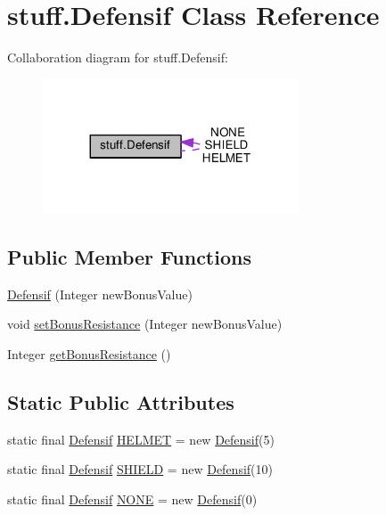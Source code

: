 \hypertarget{classstuff_1_1_defensif}{}\section{stuff.\+Defensif Class Reference}
\label{classstuff_1_1_defensif}


Collaboration diagram for stuff.\+Defensif\+:\nopagebreak
\begin{figure}[H]
\begin{center}
\leavevmode
\includegraphics[width=215pt]{classstuff_1_1_defensif__coll__graph}
\end{center}
\end{figure}
\subsection*{Public Member Functions}
\begin{DoxyCompactItemize}
\item 
\hyperlink{classstuff_1_1_defensif_a80561aaf769f44326898b42fb6858bef}{Defensif} (Integer new\+Bonus\+Value)
\item 
void \hyperlink{classstuff_1_1_defensif_a321e58e3129d7e11e4f67b5217713cc8}{set\+Bonus\+Resistance} (Integer new\+Bonus\+Value)
\item 
Integer \hyperlink{classstuff_1_1_defensif_ac92baf4d044b06d44086c54e6099cad2}{get\+Bonus\+Resistance} ()
\end{DoxyCompactItemize}
\subsection*{Static Public Attributes}
\begin{DoxyCompactItemize}
\item 
static final \hyperlink{classstuff_1_1_defensif}{Defensif} \hyperlink{classstuff_1_1_defensif_adf59790d842ebf28a331743caebc2790}{H\+E\+L\+M\+ET} = new \hyperlink{classstuff_1_1_defensif}{Defensif}(5)
\item 
static final \hyperlink{classstuff_1_1_defensif}{Defensif} \hyperlink{classstuff_1_1_defensif_abb7ed080847ab7471ae33d9eecb2a80f}{S\+H\+I\+E\+LD} = new \hyperlink{classstuff_1_1_defensif}{Defensif}(10)
\item 
static final \hyperlink{classstuff_1_1_defensif}{Defensif} \hyperlink{classstuff_1_1_defensif_ad74fec67a8e1ecf651de6078ebb89f8a}{N\+O\+NE} = new \hyperlink{classstuff_1_1_defensif}{Defensif}(0)
\end{DoxyCompactItemize}


